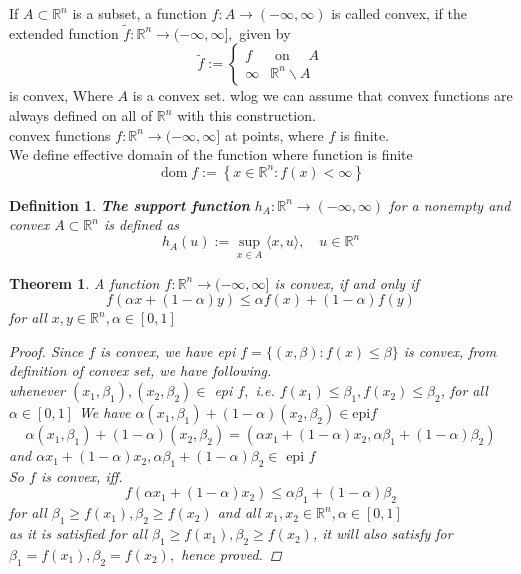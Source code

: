 \documentclass[oneside]{book}
\newtheorem{theorem}{Theorem}[section]
\newtheorem{mydef}{Definition}
\begin{document}
 If $A \subset \mathbb{R}^{n}$ is a subset, a function $f: A \rightarrow(-\infty, \infty)$ is called convex, if the extended function $\tilde{f}: \mathbb{R}^{n} \rightarrow(-\infty, \infty],$ given by
$$
\tilde{f}:=\left\{\begin{array}{ll}
f & \text { on } \quad A \\
\infty & \mathbb{R}^{n} \backslash A
\end{array}\right.
$$
is convex,  Where  $A$ is a convex set. wlog we can assume that convex functions are always defined on all of $\mathbb{R}^{n}$ with this construction.\\
convex functions $f: \mathbb{R}^{n} \rightarrow(-\infty, \infty]$ at points, where $f$ is finite. \\
We define effective domain of the function where function is finite
$$
\operatorname{dom} f:=\left\{x \in \mathbb{R}^{n}: f(x)<\infty\right\}
$$



\begin{mydef}
 \textbf{The support function }$h_{A}: \mathbb{R}^{n} \rightarrow(-\infty, \infty) $  for a nonempty and convex $A \subset \mathbb{R}^{n}$ is defined as
$$
h_{A}(u):=\sup _{x \in A}\langle x, u\rangle, \quad u \in \mathbb{R}^{n}
$$

\end{mydef}




\begin{theorem}
 A function $f: \mathbb{R}^{n} \rightarrow(-\infty, \infty]$ is convex, if and only if
$$
f(\alpha x+(1-\alpha) y) \leq \alpha f(x)+(1-\alpha) f(y)
$$
for all $x, y \in \mathbb{R}^{n}, \alpha \in[0,1]$
\begin{proof}

Since $f$ is convex, we have epi $f=\{(x, \beta): f(x) \leq \beta\}$ is convex, from definition of convex set, we have following. \\
whenever $\left(x_{1}, \beta_{1}\right),\left(x_{2}, \beta_{2}\right) \in$ epi $f,$ i.e. $f\left(x_{1}\right) \leq \beta_{1}, f\left(x_{2}\right) \leq \beta_{2}$, for all $\alpha \in[0,1]$
 We have
 $\alpha\left(x_{1}, \beta_{1}\right)+(1-\alpha)\left(x_{2}, \beta_{2}\right) \in \text{epi} f$
 $$
\alpha\left(x_{1}, \beta_{1}\right)+(1-\alpha)\left(x_{2}, \beta_{2}\right)=  \left(\alpha x_{1}+(1-\alpha) x_{2}, \alpha \beta_{1}+(1-\alpha) \beta_{2}\right)
$$
and  $ \alpha x_{1}+(1-\alpha) x_{2}, \alpha \beta_{1}+(1-\alpha) \beta_{2} \in \text { epi } f $
\\
So $f$ is convex, iff.
$$
f\left(\alpha x_{1}+(1-\alpha) x_{2}\right) \leq \alpha \beta_{1}+(1-\alpha) \beta_{2}
$$
for   all $ \beta_{1} \geq f\left(x_{1}\right), \beta_{2} \geq f\left(x_{2}\right) $ and  all $ x_{1}, x_{2} \in \mathbb{R}^{n}, \alpha \in[0,1]$ \\
as it is satisfied for all $ \beta_{1} \geq f\left(x_{1}\right), \beta_{2} \geq f\left(x_{2}\right) $, it will also satisfy for $\beta_{1}=f\left(x_{1}\right), \beta_{2}=f\left(x_{2}\right),$  hence proved.  
\end{proof}
\end{theorem} 
\end{document}

